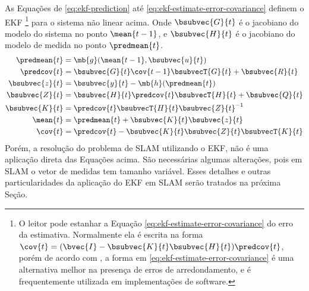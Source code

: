 As Equações de \ref{eq:ekf-prediction} até \ref{eq:ekf-estimate-error-covariance} definem o EKF \footnote{O leitor pode estanhar a Equação \ref{eq:ekf-estimate-error-covariance} do erro da estimativa. Normalmente ela é escrita na forma $\cov{t} = (\bvec{I} - \bsubvec{K}{t} \bsubvec{H}{t}) \predcov{t}$, porém de acordo com , a forma em \ref{eq:ekf-estimate-error-covariance} é uma alternativa melhor na presença de erros de arredondamento, e é frequentemente utilizada em implementações de software.} para o sistema não linear acima. Onde $\bsubvec{G}{t}$ é o jacobiano do modelo do sistema no ponto $\mean{t-1}$, e $\bsubvec{H}{t}$ é o jacobiano do modelo de medida no ponto $\predmean{t}$.
\begin{align}
  \predmean{t} &= \mb{g}(\mean{t-1}, \bsubvec{u}{t})
  \label{eq:ekf-prediction}\\
  \predcov{t} &= \bsubvec{G}{t}\cov{t-1}\bsubvecT{G}{t} + \bsubvec{R}{t}
  \label{eq:ekf-prediction-error-covariance}\\
  \bsubvec{z}{t} &= \bsubvec{y}{t} - \mb{h}(\predmean{t})
  \label{eq:ekf-inovation} \\
  \bsubvec{Z}{t} &= \bsubvec{H}{t}\predcov{t}\bsubvecT{H}{t} + \bsubvec{Q}{t}
  \label{eq:ekf-inovation-covariance} \\
  \bsubvec{K}{t} &=   \predcov{t}\bsubvecT{H}{t} \bsubvec{Z}{t}^{-1}
  \label{eq:ekf-gain}\\
  \mean{t} &= \predmean{t} + \bsubvec{K}{t} \bsubvec{z}{t}
  \label{eq:ekf-update}\\
  \cov{t} &= \predcov{t} - \bsubvec{K}{t}\bsubvec{Z}{t}\bsubvecT{K}{t}
  \label{eq:ekf-estimate-error-covariance}
\end{align}
Porém, a resolução do problema de SLAM utilizando o EKF, não é uma aplicação 
direta das Equações acima. São necessárias algumas alterações, pois em SLAM o vetor de medidas tem tamanho variável. Esses detalhes e outras particularidades da aplicação do EKF em SLAM serão tratados na próxima Seção.

